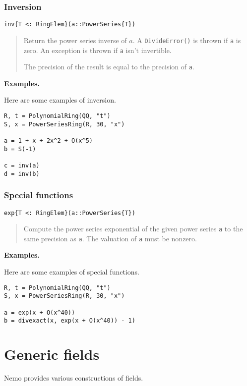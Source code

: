 \documentclass[a4paper,10pt]{article}
\newcommand{\code}{\lstinline}
\newcommand{\desc}[1]{\vspace{-3mm}\begin{quote}#1\end{quote}}
\begin{document}
\subsubsection{Inversion}

\begin{lstlisting}
inv{T <: RingElem}(a::PowerSeries{T})
\end{lstlisting}

\desc{Return the power series inverse of $a$. A \code{DivideError()} is thrown 
if \code{a} is zero. An exception is thrown if \code{a} isn't invertible.

The precision of the result is equal to the precision of \code{a}.}

\textbf{Examples.}

Here are some examples of inversion.

\begin{lstlisting}
R, t = PolynomialRing(QQ, "t")
S, x = PowerSeriesRing(R, 30, "x")

a = 1 + x + 2x^2 + O(x^5)
b = S(-1)

c = inv(a)
d = inv(b)
\end{lstlisting}

\subsubsection{Special functions}

\begin{lstlisting}
exp{T <: RingElem}(a::PowerSeries{T})
\end{lstlisting}

\desc{Compute the power series exponential of the given power series \code{a}
to the same precision as \code{a}. The valuation of \code{a} must be nonzero.}

\textbf{Examples.}

Here are some examples of special functions.

\begin{lstlisting}
R, t = PolynomialRing(QQ, "t")
S, x = PowerSeriesRing(R, 30, "x")

a = exp(x + O(x^40))
b = divexact(x, exp(x + O(x^40)) - 1)
\end{lstlisting}

\section{Generic fields}

Nemo provides various constructions of fields. 
\end{document}
